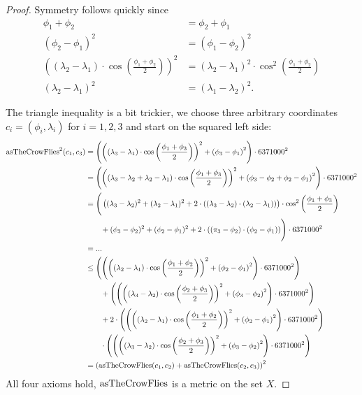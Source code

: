 \begin{proof}
		Symmetry follows quickly since
		\begin{align*}
			\phi_1 + \phi_2	&= \phi_2 + \phi_1\\
			(\phi_2 - \phi_1)^2	&= (\phi_1 - \phi_2)^2\\
			\left((\lambda_2 - \lambda_1) \cdot \cos\left(\frac{\phi_1 + \phi_2}{2}\right)\right)^2
				&= (\lambda_2 - \lambda_1)^2 \cdot \cos^2\left(\frac{\phi_1 + \phi_2}{2}\right)\\
			(\lambda_2 - \lambda_1)^2	&= (\lambda_1 - \lambda_2)^2.
		\end{align*}
		
		The triangle inequality is a bit trickier, we choose three arbitrary coordinates $c_i = (\phi_i, \lambda_i)$ for $i = 1, 2, 3$
		and start on the squared left side:
		\begin{align*}
			\operatorname{asTheCrowFlies}^2(c_1, c_3)
				&= \left(\left(\left(\lambda_3 - \lambda_1\right) \cdot \cos\left(\frac{\phi_1 + \phi_3}{2}\right)\right)^2
					+ \left(\phi_3 - \phi_1\right)^2\right) \cdot 6371000^2\\
				&= \left(\left(\left(\lambda_3 - \lambda_2 + \lambda_2 - \lambda_1\right) \cdot \cos\left(\frac{\phi_1 + \phi_3}{2}\right)\right)^2
					+ \left(\phi_3 - \phi_2 + \phi_2 - \phi_1\right)^2\right) \cdot 6371000^2\\
				&= \Bigg(\left((\lambda_3 - \lambda_2)^2 + (\lambda_2 - \lambda_1)^2 + 2 \cdot ((\lambda_3 - \lambda_2) \cdot (\lambda_2 - \lambda_1))\right)
						\cdot \cos^2\left(\frac{\phi_1 + \phi_3}{2}\right)\\
					&\qquad + (\phi_3 - \phi_2)^2 + (\phi_2 - \phi_1)^2 + 2 \cdot ((\pi_3 - \phi_2) \cdot (\phi_2 - \phi_1))\Bigg) \cdot 6371000^2\\
				&= ...\\
				&\le \left(\left(\left(\left(\lambda_2 - \lambda_1\right) \cdot \cos\left(\frac{\phi_1 + \phi_2}{2}\right)\right)^2
						+ \left(\phi_2 - \phi_1\right)^2\right) \cdot 6371000^2\right)\\
					&\qquad+ \left(\left(\left(\left(\lambda_3 - \lambda_2\right) \cdot \cos\left(\frac{\phi_2 + \phi_3}{2}\right)\right)^2
						+ \left(\phi_3 - \phi_2\right)^2\right) \cdot 6371000^2\right)\\
					&\qquad + 2 \cdot \left(\left(\left(\left(\lambda_2 - \lambda_1\right) \cdot \cos\left(\frac{\phi_1 + \phi_2}{2}\right)\right)^2
						+ \left(\phi_2 - \phi_1\right)^2\right) \cdot 6371000^2\right)\\
					&\qquad \cdot \left(\left(\left(\left(\lambda_3 - \lambda_2\right) \cdot \cos\left(\frac{\phi_2 + \phi_3}{2}\right)\right)^2
						+ \left(\phi_3 - \phi_2\right)^2\right) \cdot 6371000^2\right)\\
				&= \left(\operatorname{asTheCrowFlies}(c_1, c_2) + \operatorname{asTheCrowFlies}(c_2, c_3)\right)^2
		\end{align*}
		All four axioms hold, $\operatorname{asTheCrowFlies}$ is a metric on the set $X$.
	\end{proof}
